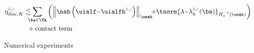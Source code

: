 \begin{frame}
{{{\begin{minipage}[c]{0.65 \textwidth}
\begin{theorem}[\footnotesize{Local efficiency under adaptive stopping criteria} : \textcolor{red}{p=1}]
\vspace{-0.5 cm}
\begin{equation*}
\begin{split}
\eta_{\mathrm{disc},K}^{\kk,\ii}  \lesssim \hspace{-0.1 cm}  \hspace{-0.1 cm} & \sum_{\ba \in \Vh} \left(\left\| \nab \left(\uialf \hspace{-0.1 cm} - \hspace{-0.1 cm} \uialfh^{\kk,\ii} \right)  \right\|_{\omah} \hspace{-0.15 cm} + \hspace{-0.1 cm} \tnorm{\lambda \hspace{-0.1 cm} - \hspace{-0.1 cm} \lambda_h^{\kk,\ii}(\ba)}_{H^{-1}_{*}(\omah)}\right) \\
& +  \mathrm{contact \ term}
\end{split}
\end{equation*}
\end{theorem}
\end{minipage}
 }}}
\end{frame}
%
\begin{frame}[noframenumbering]
\centering
\Huge{\textcolor{carmine}{Numerical experiments}}
\end{frame}
%
